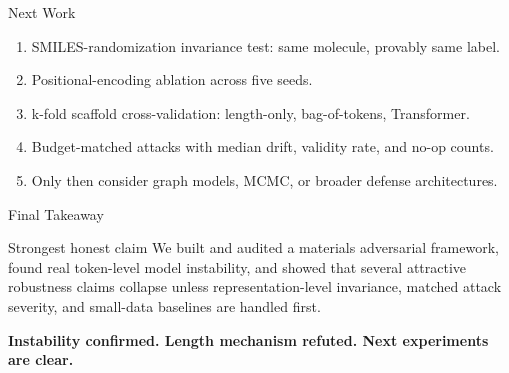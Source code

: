 \documentclass[aspectratio=169,10pt]{beamer}
\begin{document}
\begin{frame}{Next Work}
\begin{enumerate}
  \item SMILES-randomization invariance test: same molecule, provably same label.
  \item Positional-encoding ablation across five seeds.
  \item k-fold scaffold cross-validation: length-only, bag-of-tokens, Transformer.
  \item Budget-matched attacks with median drift, validity rate, and no-op counts.
  \item Only then consider graph models, MCMC, or broader defense architectures.
\end{enumerate}
\end{frame}

\begin{frame}{Final Takeaway}
\begin{block}{Strongest honest claim}
We built and audited a materials adversarial framework, found real token-level model instability, and showed that several attractive robustness claims collapse unless representation-level invariance, matched attack severity, and small-data baselines are handled first.
\end{block}

\vspace{1em}
\centering
{\Large\bfseries Instability confirmed. Length mechanism refuted. Next experiments are clear.}
\end{frame}
\end{document}
